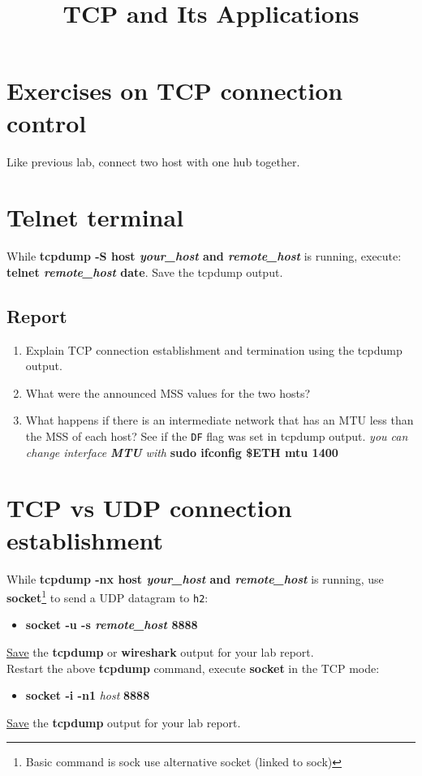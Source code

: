\documentclass{../UTNetLab}
\title{TCP and Its Applications}
\author{%
    Dr. Ahmad Khonsari - \FR{دکتر احمد خونساری}\\
    \href{mailto:a_khonsari@ut.ac.ir}{a\_khonsari@ut.ac.ir}\\
    \vskip 1.5em%
    Amir Haji Ali Khamseh'i - \FR{امیر حاجی‌علی‌خمسه‌ء}\\
    \href{mailto:khamse@ut.ac.ir}{khamse@ut.ac.ir}\\
    \vskip 1.5em%
    \href{mailto:m.borhani@ut.ac.ir}{Muhammad Borhani} - \FR{محمد برهانی}\\
    \href{mailto:a.a.khordadi@ut.ac.ir}{Amirahmad Khordadi} - \FR{امیراحمد خردادی}\\
    \href{mailto:sina\_kashipazha@ut.ac.ir}{Sina Kashi pazha} - \FR{سینا کاشی‌پزها}
}
\begin{document}
    \maketitle

\section*{Exercises on TCP connection control}
    Like previous lab, connect two host with one hub together.

\section{Telnet terminal}
    While \textbf{tcpdump -S host \textit{your\_host} and \textit{remote\_host}} is running, execute: \textbf{telnet \textit{remote\_host} date}.
    Save the tcpdump output.
	\subsection*{Report}
	\begin{enumerate}
		\item Explain TCP connection establishment and termination using the tcpdump output.
		\item What were the announced MSS values for the two hosts?
		\item What happens if there is an intermediate network that has an MTU less than the MSS of each host?
		See if the \texttt{DF} flag was set in tcpdump output.
		\textit{you can change interface \textbf{MTU} with} \textbf{sudo ifconfig \$ETH mtu 1400}
	\end{enumerate}
    
\section{TCP vs UDP connection establishment}
    While \textbf{tcpdump -nx host \textit{your\_host} and \textit{remote\_host}} is running, use \textbf{socket}\footnote{Basic command is sock use alternative socket (linked to sock)} to send a UDP datagram to \texttt{h2}:
	\begin{itemize}
		\item \textbf{socket -u -s \textit{remote\_host} 8888}
	\end{itemize}
    \underline{Save} the \textbf{tcpdump} or \textbf{wireshark} output for your lab report. \\
	Restart the above \textbf{tcpdump} command, execute \textbf{socket} in the TCP mode:
	\begin{itemize}
		\item \textbf{socket -i -n1} \textit{host} \textbf{8888}
	\end{itemize}
    \underline{Save} the \textbf{tcpdump} output for your lab report.
\end{document}

